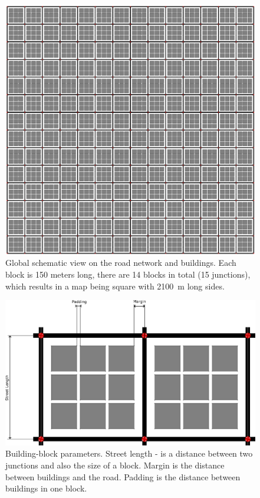 \documentclass[]{nsm-thesis}
\begin{document}
\begin{figure}
	\centering
	\includegraphics[width=1\textwidth]{figures/ManhattanGrid.png}
	\caption{Global schematic view on the road network and buildings. Each block is 150 meters long, there are 14 blocks in total (15 junctions), which results in a map being square with \SI{2100}{\meter} long sides.}
	\label{fig:manhattangrid}
\end{figure}


\begin{figure}
	\centering
	\includegraphics[width=1\textwidth]{figures/ManhattanGridBlock-commented.png}
	\caption{Building-block parameters. Street length - is a distance between two junctions and also the size of a block. Margin is the distance between buildings and the road. Padding is the distance between buildings in one block.}
	\label{fig:manhattangridblock}
\end{figure}
\end{document}

